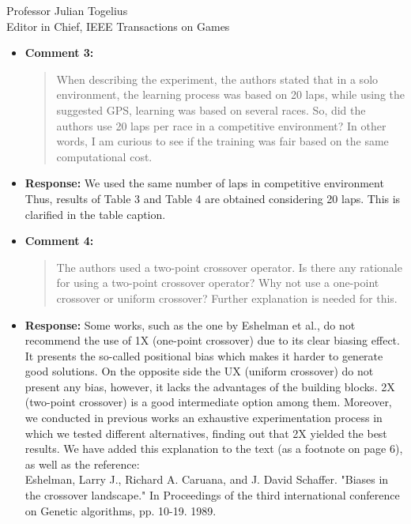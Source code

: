 \documentclass[10pt]{letter} %
\begin{document}
\begin{letter}{Professor Julian Togelius \\ Editor in Chief, IEEE Transactions on Games}
\begin{enumerate}
\begin{itemize}
\begin{itemize}
	\end{itemize}			
		\item {\bf Comment 3:}
		\begin{quote}
		When describing the experiment, the authors stated that in a solo environment, the learning process was based on 20 laps, while using the suggested GPS, learning was based on several races. So, did the authors use 20 laps per race in a competitive environment? In other words, I am curious to see if the training was fair based on the same computational cost.
			\end{quote}	
		\item {\bf Response:} 
		We used the same number of laps in competitive
                environment Thus, results of Table 3 and Table 4 are
                obtained considering 20 laps. This is clarified in the
                table caption.
		\item {\bf Comment 4:}
		\begin{quote}
The authors used a two-point crossover operator. Is there any rationale for using a two-point crossover operator? Why not use a one-point crossover or uniform crossover? Further explanation is needed for this.
			\end{quote}	
		\item {\bf Response:} 
Some works, such as the one by Eshelman et al., do not recommend the use of 1X (one-point crossover) due to its clear biasing effect. It presents the so-called positional bias which makes it harder to generate good solutions. On the opposite side the UX (uniform crossover) do not present any bias, however, it lacks the advantages of the building blocks. 2X (two-point crossover) is a good intermediate option among them. Moreover, we conducted in previous works an exhaustive experimentation process in which we tested different alternatives, finding out that 2X yielded the best results.
We have added this explanation to the text (as a footnote on page 6), as well as the reference:\\
Eshelman, Larry J., Richard A. Caruana, and J. David Schaffer. "Biases
in the crossover landscape." In Proceedings of the third international
conference on Genetic algorithms, pp. 10-19. 1989.


\end{itemize}
\end{enumerate}
\end{letter}
\end{document}
